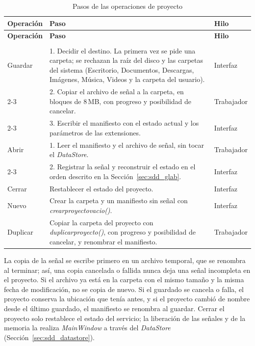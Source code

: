 \documentclass[12pt,letterpaper,oneside]{article}
\DeclareRobustCommand{\_}{\textunderscore\allowbreak}
\begin{document}
\begin{center}
\small
\begin{longtable}{|p{}|p{}|p{}|}
\hline
\textbf{Operación} & \textbf{Paso} & \textbf{Hilo} \\
\hline
\endfirsthead
\hline
\textbf{Operación} & \textbf{Paso} & \textbf{Hilo} \\
\hline
\endhead
\hline
\endfoot
\hline
\caption{Pasos de las operaciones de proyecto} \label{tab:sdd_project_pasos} \\
\endlastfoot
Guardar & 1. Decidir el destino. La primera vez se pide una carpeta; se rechazan la raíz del disco y las carpetas del sistema (Escritorio, Documentos, Descargas, Imágenes, Música, Videos y la carpeta del usuario). & Interfaz \\
\cline{2-3}
 & 2. Copiar el archivo de señal a la carpeta, en bloques de 8\,MB, con progreso y posibilidad de cancelar. & Trabajador \\
\cline{2-3}
 & 3. Escribir el manifiesto con el estado actual y los parámetros de las extensiones. & Interfaz \\
\hline
Abrir & 1. Leer el manifiesto y el archivo de señal, sin tocar el \textit{DataStore}. & Trabajador \\
\cline{2-3}
 & 2. Registrar la señal y reconstruir el estado en el orden descrito en la Sección~\ref{sec:sdd_glab}. & Interfaz \\
\hline
Cerrar & Restablecer el estado del proyecto. & Interfaz \\
\hline
Nuevo & Crear la carpeta y un manifiesto sin señal con \textit{crear\_proyecto\_vacio()}. & Interfaz \\
\hline
Duplicar & Copiar la carpeta del proyecto con \textit{duplicar\_proyecto()}, con progreso y posibilidad de cancelar, y renombrar el manifiesto. & Trabajador \\
\hline
\end{longtable}
\end{center}

La copia de la señal se escribe primero en un archivo temporal, que se renombra al terminar; así, una copia cancelada o fallida nunca deja una señal incompleta en el proyecto. Si el archivo ya está en la carpeta con el mismo tamaño y la misma fecha de modificación, no se copia de nuevo. Si el guardado se cancela o falla, el proyecto conserva la ubicación que tenía antes, y si el proyecto cambió de nombre desde el último guardado, el manifiesto se renombra al guardar. Cerrar el proyecto solo restablece el estado del servicio; la liberación de las señales y de la memoria la realiza \textit{MainWindow} a través del \textit{DataStore} (Sección~\ref{sec:sdd_datastore}).
\end{document}

